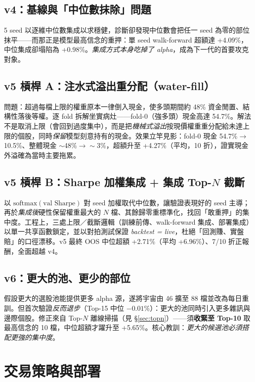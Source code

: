 \documentclass[11pt, fontset=none]{ctexart}
\begin{document}
\subsection{v4：基線與「中位數抹除」問題}
5 seed 以逐維中位數集成以求穩健，診斷卻發現中位數會把任一 seed 為零的部位抹平——而那正是模型最高信念的重押：單 seed walk-forward 超額達 +4.09\%，中位集成卻塌陷為 +0.98\%。\emph{集成方式本身吃掉了 alpha}，成為下一代的首要攻克對象。

\subsection{v5 槓桿 A：注水式溢出重分配（water-fill）}
問題：超過每檔上限的權重原本一律倒入現金，使多頭期間約 48\% 資金閒置、結構性落後等權。逐 fold 拆解坐實病灶——fold-0（強多頭）現金高達 54.7\%。解法不是取消上限（會回到過度集中），而是把\emph{機械式溢出}按現價權重重分配給未達上限的個股，同時\emph{保留}模型刻意持有的現金。效果立竿見影：fold-0 現金 54.7\%$\to$10.5\%、整體現金 $\sim$48\%$\to\sim$3\%，超額升至 +4.27\%（平均，10 折），證實現金外溢確為當時主要拖累。

\subsection{v5 槓桿 B：Sharpe 加權集成 + 集成 Top-$N$ 截斷}
以 $\mathrm{softmax}(\text{val Sharpe})$ 對 seed 加權取代中位數，讓驗證表現好的 seed 主導；再於\emph{集成後}硬性保留權重最大的 $N$ 檔、其餘歸零重標準化，找回「敢重押」的集中度。工程上，三處上限／截斷邏輯（訓練前傳、walk-forward 集成、部署集成）以單一共享函數鎖定，並以對拍測試保證 \emph{backtest = live}，杜絕「回測賺、實盤賠」的口徑漂移。v5 最終 OOS 中位超額 +2.71\%（平均 +6.96\%）、7/10 折正報酬，全面超越 v4。

\subsection{v6：更大的池、更少的部位}
假設更大的選股池能提供更多 alpha 源，遂將宇宙由 46 擴至 88 檔並改為每日重訓。但首次驗證\emph{反而退步}（Top-15 中位 $-0.01\%$）：更大的池同時引入更多雜訊與邊際個股。修正來自 Top-$N$ 離線掃描（見 \S\ref{sec:topn}）——須\textbf{收緊至 Top-10} 取最高信念的 10 檔，中位超額才躍升至 +5.65\%。核心教訓：\emph{更大的候選池必須搭配更強的集中度}。

\section{交易策略與部署}
\end{document}

